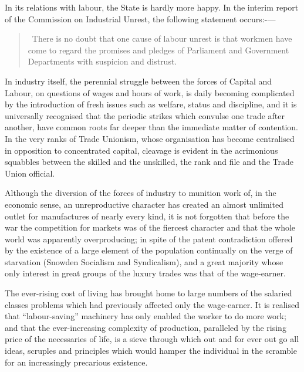 \documentclass{book}
\begin{document}
In its relations with labour, the State is hardly more happy. In the interim report of the Commission on Industrial Unrest, the following statement occurs:-—

\begin{quotation}\
	There is no doubt that one cause of labour unrest is that workmen have come to regard the promises and pledges of Parliament and Government Departments with suspicion and distrust.
\end{quotation}

In industry itself, the perennial struggle between the forces of Capital and Labour, on questions of wages and hours of work, is daily becoming complicated by the introduction of fresh issues such as welfare, status and discipline, and it is universally recognised that the periodic strikes which convulse one trade after another, have common roots far deeper than the immediate matter of contention. In the very ranks of Trade Unionism, whose organisation has become centralised in opposition to concentrated capital, cleavage is evident in the acrimonious squabbles between the skilled and the unskilled, the rank and file and the Trade Union official.

Although the diversion of the forces of industry to munition work of, in the economic sense, an unreproductive character has created an almost unlimited outlet for manufactures of nearly every kind, it is not forgotten that before the war the competition for markets was of the fiercest character and that the whole world was apparently overproducing; in spite of the patent contradiction offered by the existence of a large element of the population continually on the verge of starvation (Snowden Socialism and Syndicalism), and a great majority whose only interest in great groups of the luxury trades was that of the wage-earner.

The ever-rising cost of living has brought home to large numbers of the salaried classes problems which had previously affected only the wage-earner. It is realised that “labour-saving” machinery has only enabled the worker to do more work; and that the ever-increasing complexity of production, paralleled by the rising price of the necessaries of life, is a sieve through which out and for ever out go all ideas, scruples and principles which would hamper the individual in the scramble for an increasingly precarious existence.
\end{document}
